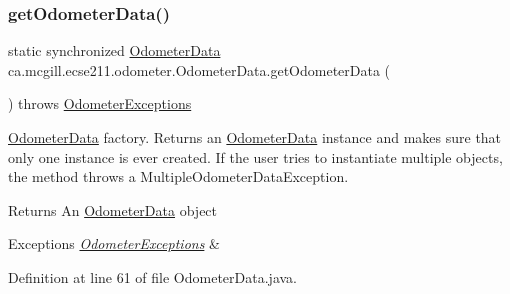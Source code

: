 \subsubsection{\texorpdfstring{get\+Odometer\+Data()}{getOdometerData()}}
{\footnotesize\ttfamily static synchronized \hyperlink{classca_1_1mcgill_1_1ecse211_1_1odometer_1_1_odometer_data}{Odometer\+Data} ca.\+mcgill.\+ecse211.\+odometer.\+Odometer\+Data.\+get\+Odometer\+Data (\begin{DoxyParamCaption}{ }\end{DoxyParamCaption}) throws \hyperlink{classca_1_1mcgill_1_1ecse211_1_1odometer_1_1_odometer_exceptions}{Odometer\+Exceptions}\hspace{0.3cm}{\ttfamily [static]}}

\hyperlink{classca_1_1mcgill_1_1ecse211_1_1odometer_1_1_odometer_data}{Odometer\+Data} factory. Returns an \hyperlink{classca_1_1mcgill_1_1ecse211_1_1odometer_1_1_odometer_data}{Odometer\+Data} instance and makes sure that only one instance is ever created. If the user tries to instantiate multiple objects, the method throws a Multiple\+Odometer\+Data\+Exception.

\begin{DoxyReturn}{Returns}
An \hyperlink{classca_1_1mcgill_1_1ecse211_1_1odometer_1_1_odometer_data}{Odometer\+Data} object 
\end{DoxyReturn}

\begin{DoxyExceptions}{Exceptions}
{\em \hyperlink{classca_1_1mcgill_1_1ecse211_1_1odometer_1_1_odometer_exceptions}{Odometer\+Exceptions}} & \\
\hline
\end{DoxyExceptions}


Definition at line 61 of file Odometer\+Data.\+java.


